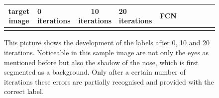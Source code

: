 \begin{figure}[H]
	\begin{center}
		\begin{tabular}{SC|SC|SC|SC|SC}
			target image & 0 iterations & 10 iterations & 20 iterations & FCN\\ \hline
			 &
			 &
			 &
			&
			 \\
		\end{tabular}
	\end{center}
	\caption{This picture shows the development of the labels after 0, 10 and 20 iterations. Noticeable in this sample image are not only the eyes as mentioned before but also the shadow of the nose, which is first segmented as a background. Only after a certain number of iterations these errors are partially recognised and provided with the correct label.}
	\label{fig:iterations}
\end{figure}

